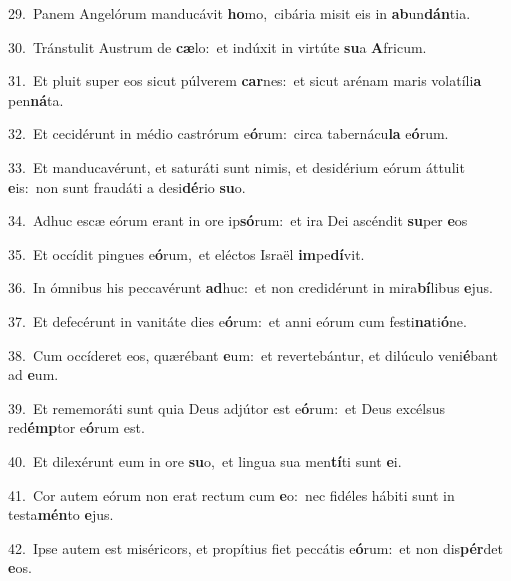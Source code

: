 {\numbfont\textcolor{\numbcolor}{29.}}~Panem Angelórum manducávit \textbf{ho}\-mo,~\star cibária misit eis in \textbf{ab}\-un\-\textbf{dán}\-tia.\par
{\numbfont\textcolor{\numbcolor}{30.}}~Tránstulit Austrum de \textbf{cæ}\-lo:~\star et indúxit in virtúte \textbf{su}\-a \textbf{A}\-fricum.\par
{\numbfont\textcolor{\numbcolor}{31.}}~Et pluit super eos sicut púlverem \textbf{car}\-nes:~\star et sicut arénam maris volatíli\textbf{a} pen\-\textbf{ná}\-ta.\par
{\numbfont\textcolor{\numbcolor}{32.}}~Et cecidérunt in médio castrórum e\-\textbf{ó}\-rum:~\star circa tabernácu\textbf{la} e\-\textbf{ó}\-rum.\par
{\numbfont\textcolor{\numbcolor}{33.}}~Et manducavérunt, et saturáti sunt nimis, et desidérium eórum áttulit \textbf{e}\-is:~\star non sunt fraudáti a desi\-\textbf{dé}\-rio \textbf{su}\-o.\par
{\numbfont\textcolor{\numbcolor}{34.}}~Adhuc escæ eórum erant in ore ip\-\textbf{só}\-rum:~\star et ira Dei ascéndit \textbf{su}\-per \textbf{e}\-os\par
{\numbfont\textcolor{\numbcolor}{35.}}~Et occídit pingues e\-\textbf{ó}\-rum,~\star et eléctos Israël \textbf{im}\-pe\-\textbf{dí}\-vit.\par
{\numbfont\textcolor{\numbcolor}{36.}}~In ómnibus his peccavérunt \textbf{ad}\-huc:~\star et non credidérunt in mira\-\textbf{bí}\-libus \textbf{e}\-jus.\par
{\numbfont\textcolor{\numbcolor}{37.}}~Et defecérunt in vanitáte dies e\-\textbf{ó}\-rum:~\star et anni eórum cum festi\-\textbf{na}\-ti\-\textbf{ó}\-ne.\par
{\numbfont\textcolor{\numbcolor}{38.}}~Cum occíderet eos, quærébant \textbf{e}\-um:~\star et revertebántur, et dilúculo veni\-\textbf{é}\-bant ad \textbf{e}\-um.\par
{\numbfont\textcolor{\numbcolor}{39.}}~Et rememoráti sunt quia Deus adjútor est e\-\textbf{ó}\-rum:~\star et Deus excélsus red\-\textbf{émp}\-tor e\-\textbf{ó}\-rum est.\par
{\numbfont\textcolor{\numbcolor}{40.}}~Et dilexérunt eum in ore \textbf{su}\-o,~\star et lingua sua men\-\textbf{tí}\-ti sunt \textbf{e}\-i.\par
{\numbfont\textcolor{\numbcolor}{41.}}~Cor autem eórum non erat rectum cum \textbf{e}\-o:~\star nec fidéles hábiti sunt in testa\-\textbf{mén}\-to \textbf{e}\-jus.\par
{\numbfont\textcolor{\numbcolor}{42.}}~Ipse autem est miséricors, et propítius fiet peccátis e\-\textbf{ó}\-rum:~\star et non dis\-\textbf{pér}\-det \textbf{e}\-os.\par
